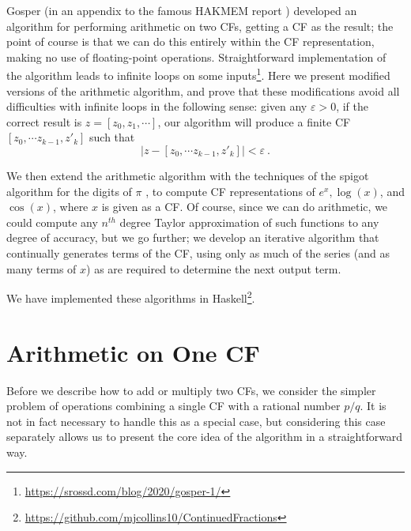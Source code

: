 \documentclass[11pt, oneside]{amsart}   	%
\renewcommand{\:}{\negthickspace:\negthickspace}
\begin{document}
Gosper (in an appendix to the famous HAKMEM report \cite{hakmem}) 
developed an algorithm for performing arithmetic on two CFs, getting a CF as the result;
the point of course is that we can do this entirely within the CF representation, making no use of floating-point operations. Straightforward implementation of the algorithm leads to infinite loops on some inputs\footnote{\href{https://srossd.com/blog/2020/gosper-1/}{https://srossd.com/blog/2020/gosper-1/}}.
Here we present modified versions of the arithmetic algorithm, and prove that these modifications avoid all difficulties with infinite loops in the following sense: given any $\varepsilon > 0$, if the correct result is $z=[z_0,z_1,\cdots]$, our algorithm will produce a finite CF $[z_0, \cdots z_{k-1}, z'_k]$ such that 
\[
|z - [z_0, \cdots z_{k-1}, z'_k]| < \varepsilon\ .
\]

We then extend the arithmetic algorithm with the techniques of the spigot algorithm for the digits of $\pi$ \cite{Gibbons2016,Rabinowitz2016}, to compute CF representations of $e^x, \log(x)$, and  $\cos(x)$, where $x$ is given as a CF. 
Of course, since we can do arithmetic, we could compute any $n^{th}$ degree Taylor approximation of such functions to any degree of accuracy, but we go further;
we develop an iterative algorithm that continually generates terms of the CF, using only as much of the series (and as many terms of $x$) as are required to determine the next output term.

We have implemented these algorithms
in Haskell\footnote{\href{https://github.com/mjcollins10/ContinuedFractions}{https://github.com/mjcollins10/ContinuedFractions}}.


\section{Arithmetic on One CF}
Before we describe how to add or multiply two CFs, we consider the simpler problem of operations combining a single CF with a
rational number $p/q$. It is not in fact necessary to handle this as a special case, but considering this case separately allows us to present the core idea of the algorithm in a straightforward way.
\end{document}
